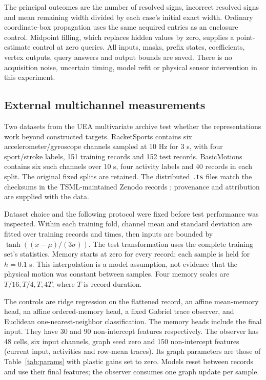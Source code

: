 \documentclass[11pt,a4paper]{article}
\theoremstyle{definition}\newtheorem{definition}[theorem]{Definition}
\begin{document}
The principal outcomes are the number of resolved signs, incorrect resolved signs and mean remaining width divided by each case's initial exact width. Ordinary coordinate-box propagation uses the same acquired entries as an enclosure control. Midpoint filling, which replaces hidden values by zero, supplies a point-estimate control at zero queries. All inputs, masks, prefix states, coefficients, vertex outputs, query answers and output bounds are saved. There is no acquisition noise, uncertain timing, model refit or physical sensor intervention in this experiment.

\subsection{External multichannel measurements}\label{sec:externalprotocol}
Two datasets from the UEA multivariate archive \cite{bagnall2018} test whether the representations work beyond constructed targets. RacketSports contains six accelerometer/gyroscope channels sampled at 10 Hz for 3 s, with four sport/stroke labels, 151 training records and 152 test records. BasicMotions contains six such channels over 10 s, four activity labels and 40 records in each split. The original fixed splits are retained. The distributed \texttt{.ts} files match the checksums in the TSML-maintained Zenodo records \cite{racketsportsdata,basicmotionsdata}; provenance and attribution are supplied with the data.

Dataset choice and the following protocol were fixed before test performance was inspected. Within each training fold, channel mean and standard deviation are fitted over training records and times, then inputs are bounded by $\tanh((x-\mu)/(3\sigma))$. The test transformation uses the complete training set's statistics. Memory starts at zero for every record; each sample is held for $h=0.1$ s. This interpolation is a model assumption, not evidence that the physical motion was constant between samples. Four memory scales are $T/16,T/4,T,4T$, where $T$ is record duration.

The controls are ridge regression on the flattened record, an affine mean-memory head, an affine ordered-memory head, a fixed Gabriel trace observer, and Euclidean one-nearest-neighbor classification. The memory heads include the final input. They have 30 and 90 non-intercept features respectively. The observer has 48 cells, six input channels, graph seed zero and 150 non-intercept features (current input, activities and row-mean traces). Its graph parameters are those of Table~\ref{tab:params} with plastic gains set to zero. Models reset between records and use their final features; the observer consumes one graph update per sample.
\end{document}
